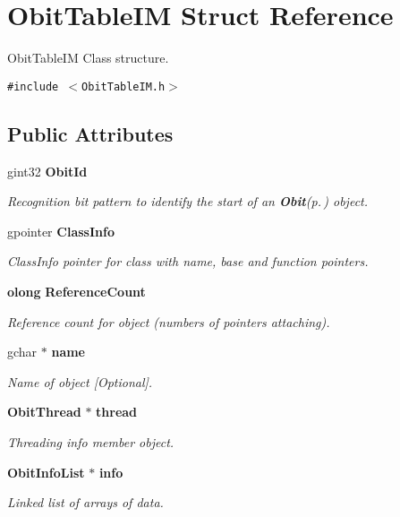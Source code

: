 \section{Obit\-Table\-IM Struct Reference}
\label{structObitTableIM}
Obit\-Table\-IM Class structure.  


{\tt \#include $<$Obit\-Table\-IM.h$>$}

\subsection*{Public Attributes}
\begin{CompactItemize}
\item 
gint32 {\bf Obit\-Id}
\begin{CompactList}\small\item\em Recognition bit pattern to identify the start of an {\bf Obit}{\rm (p.\,\pageref{structObit})} object. \item\end{CompactList}\item 
gpointer {\bf Class\-Info}
\begin{CompactList}\small\item\em Class\-Info pointer for class with name, base and function pointers. \item\end{CompactList}\item 
{\bf olong} {\bf Reference\-Count}
\begin{CompactList}\small\item\em Reference count for object (numbers of pointers attaching). \item\end{CompactList}\item 
gchar $\ast$ {\bf name}
\begin{CompactList}\small\item\em Name of object [Optional]. \item\end{CompactList}\item 
{\bf Obit\-Thread} $\ast$ {\bf thread}
\begin{CompactList}\small\item\em Threading info member object. \item\end{CompactList}\item 
{\bf Obit\-Info\-List} $\ast$ {\bf info}
\begin{CompactList}\small\item\em Linked list of arrays of data. \item\end{CompactList}\item 

\end{CompactItemize}
